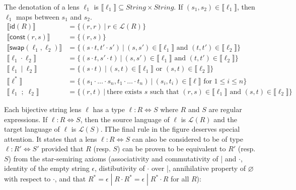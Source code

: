 \documentclass[acmsmall,review,anonymous]{acmart}
\newcommand{\codefont}[1]{\ensuremath{\mathsf{#1}}}
\newcommand{\kw}[1]{\codefont{#1}}
\newcommand{\sep}{\ensuremath{\ | \ }}
\newcommand{\const}{\ensuremath{\kw{const}}}
\newcommand{\swap}{\ensuremath{\kw{swap}}}
\newcommand{\id}{\ensuremath{\kw{id}}}
\begin{document}
The denotation of a lens $\ell_1$ is $\llbracket \ell_1 \rrbracket \subseteq
\mathit{String} \times \mathit{String}$. If $(s_1, s_2) \in \llbracket \ell_1
\rrbracket$, then $\ell_1$ maps between $s_1$ and $s_2$.
\begin{align*}
\llbracket \id(R) \rrbracket &= \{(r, r) \sep r \in \mathcal{L}(R)\}\\
\llbracket \const(r, s) \rrbracket &= \{(r, s)\}\\
\llbracket \swap(\ell_1, \ell_2) \rrbracket &= \{(s \cdot t, t' \cdot s') \sep
(s, s') \in \llbracket \ell_1 \rrbracket \text{ and } (t, t') \in \llbracket
\ell_2 \rrbracket\}\\
\llbracket \ell_1 \cdot \ell_2 \rrbracket &= \{(s \cdot t, s' \cdot t) \sep
(s, s') \in \llbracket \ell_1 \rrbracket \text{ and } (t, t') \in \llbracket
\ell_2 \rrbracket\}\\
\llbracket \ell_1 \sep \ell_2 \rrbracket &= \{(s \cdot t) \sep
(s, t) \in \llbracket \ell_1 \rrbracket \text{ or } (s, t) \in \llbracket
\ell_2 \rrbracket\}\\
\llbracket \ell^* \rrbracket &= \{(s_1 \cdot \ldots \cdot s_n, t_1 \cdot \ldots
\cdot t_n) \sep (s_i, t_i) \in \llbracket \ell \rrbracket \text{ for } 1
\leq i \leq n\}\\
\llbracket \ell_1 \; ; \; \ell_2 \rrbracket &= \{(r, t) \sep \text{there exists }s
\text{ such that } (r, s) \in \llbracket \ell_1 \rrbracket \text{ and } (s, t)
\in \llbracket \ell_2 \rrbracket\}
\end{align*}

Each bijective string lens $\ell$ has a type $\ell : R \Leftrightarrow S$ where
$R$ and $S$ are regular expressions. If $\ell : R \Leftrightarrow S$, then the
source language of $\ell$ is $\mathcal{L}(R)$ and the target language of $\ell$
is $\mathcal{L}(S)$. IThe final rule in the figure deserves special attention.
It states that a lens $\ell : R \Leftrightarrow S$ can also be considered to be
of type $\ell : R' \Leftrightarrow S'$ provided that $R$ (resp. $S$) can be
proven to be equivalent to $R'$ (resp. $S$) from the star-semiring axioms
(associativity and commutativity of | and $\cdot$, identity of the empty string
$\epsilon$, distibutivity of $\cdot$ over |, annihilative property of
$\varnothing$ with respect to $\cdot$, and that $R^* = \epsilon \; | \; R \cdot
R^* = \epsilon \; | \; R^* \cdot R$ for all $R$):

\begin{prooftree}
\end{prooftree}
\end{document}
